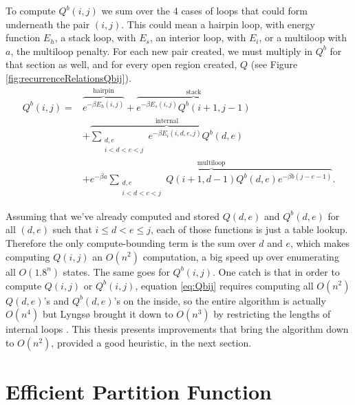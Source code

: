 To compute $Q^b(i,j)$ we sum over the 4 cases of loops that could form
underneath the pair $(i,j)$. This could mean a hairpin loop,
with energy function $E_h$, a stack loop, with $E_s$, an interior
loop, with $E_i$, or a multiloop with $a$, the multiloop penalty. For
each new pair created, we must multiply in $Q^b$ for that section as
well, and for every open region created, $Q$ (see Figure
\ref{fig:recurrenceRelationsQbij}).
\begin{equation}
\begin{split}
 Q^b(i, j) =& \overbrace{e^{-\beta E_h(i,j)}}^{\text{hairpin}} +
 \overbrace{e^{-\beta E_s(i, j)} Q^b(i+1, j-1)}^{\text{stack}} \\ 
& + \overbrace{\sum_{\substack{d,e \\ i < d< e< j}} e^{-\beta E_i(i, d, e, j)}Q^b(d,e)}^{\text{internal}} \\ 
& + \overbrace{e^{-\beta a} \sum_{\substack{d,e \\ i < d< e< j}} Q(i+1, d-1) Q^b(d,e) e^{-\beta b(j-e-1)}}^{\text{multiloop}}.
\end{split}
\label{eq:Qbij}
\end{equation}

Assuming that we've already computed and stored $Q(d,e)$ and
$Q^b(d,e)$ for all $(d,e)$ such that $ i \leq d < e \leq j$, each of
those functions is just a table lookup. Therefore the only
compute-bounding term is the sum over $d$ and $e$, which makes
computing $Q(i,j)$ an $O(n^2)$ computation, a big speed up over
enumerating all $O(1.8^n)$ states. The same goes for $Q^b(i,j)$. One
catch is that in order to compute $Q(i,j)$ or $Q^b(i,j)$, equation
\ref{eq:Qbij} requires computing all $O(n^2)$ $Q(d,e)$'s and
$Q^b(d,e)$'s on the inside, so the entire algorithm is actually
$O(n^4)$ but Lyngs{\o} brought it down to $O(n^3)$ by restricting the
lengths of internal loops \cite{lyngso2000rna}. This thesis presents
improvements that bring the algorithm down to $O(n^2)$, provided a
good heuristic, in the next section.

\section{Efficient Partition Function}

